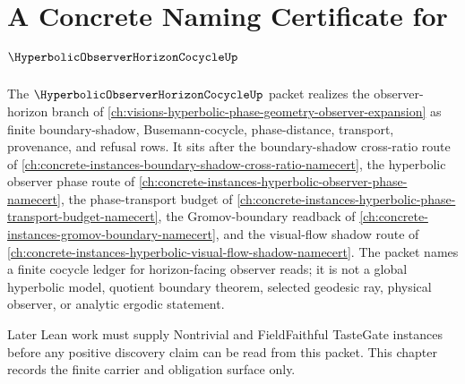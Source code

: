 \chapter{A Concrete Naming Certificate for $\HyperbolicObserverHorizonCocycleUp$}
\label{ch:concrete-instances-hyperbolic-observer-horizon-cocycle-namecert}

The $\HyperbolicObserverHorizonCocycleUp$ packet realizes the observer-horizon branch of \autoref{ch:visions-hyperbolic-phase-geometry-observer-expansion} as finite boundary-shadow, Busemann-cocycle, phase-distance, transport, provenance, and refusal rows. It sits after the boundary-shadow cross-ratio route of \autoref{ch:concrete-instances-boundary-shadow-cross-ratio-namecert}, the hyperbolic observer phase route of \autoref{ch:concrete-instances-hyperbolic-observer-phase-namecert}, the phase-transport budget of \autoref{ch:concrete-instances-hyperbolic-phase-transport-budget-namecert}, the Gromov-boundary readback of \autoref{ch:concrete-instances-gromov-boundary-namecert}, and the visual-flow shadow route of \autoref{ch:concrete-instances-hyperbolic-visual-flow-shadow-namecert}. The packet names a finite cocycle ledger for horizon-facing observer reads; it is not a global hyperbolic model, quotient boundary theorem, selected geodesic ray, physical observer, or analytic ergodic statement.



Later Lean work must supply Nontrivial and FieldFaithful TasteGate instances before any positive discovery claim can be read from this packet. This chapter records the finite carrier and obligation surface only.

